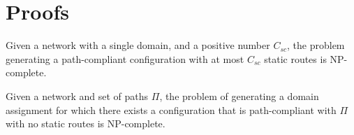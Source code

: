 \section{Proofs}
\begin{theorem}
\label{thm:ospfsynth}
Given a
network with a single domain,
and a positive number $C_{sc}$,
the problem generating
a path-compliant configuration with at most $C_{sc}$ static routes
is NP-complete.
\end{theorem}


\begin{theorem}
	Given a
	network and  set of paths  $\Pi$,
	the problem of generating a domain assignment for which
	there exists a 
	configuration that is path-compliant with $\Pi$ with no static routes
	is NP-complete.
\end{theorem}
